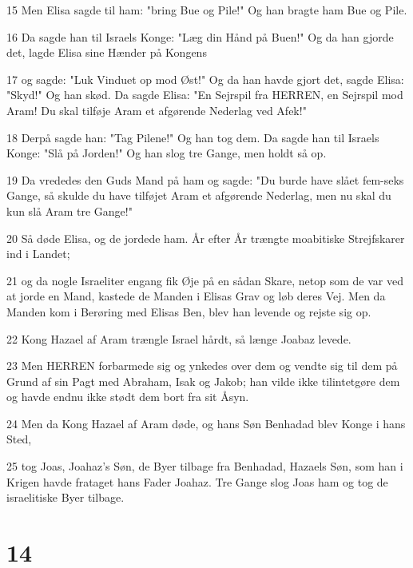 \par 15 Men Elisa sagde til ham: "bring Bue og Pile!" Og han bragte ham Bue og Pile.
\par 16 Da sagde han til Israels Konge: "Læg din Hånd på Buen!" Og da han gjorde det, lagde Elisa sine Hænder på Kongens
\par 17 og sagde: "Luk Vinduet op mod Øst!" Og da han havde gjort det, sagde Elisa: "Skyd!" Og han skød. Da sagde Elisa: "En Sejrspil fra HERREN, en Sejrspil mod Aram! Du skal tilføje Aram et afgørende Nederlag ved Afek!"
\par 18 Derpå sagde han: "Tag Pilene!" Og han tog dem. Da sagde han til Israels Konge: "Slå på Jorden!" Og han slog tre Gange, men holdt så op.
\par 19 Da vrededes den Guds Mand på ham og sagde: "Du burde have slået fem-seks Gange, så skulde du have tilføjet Aram et afgørende Nederlag, men nu skal du kun slå Aram tre Gange!"
\par 20 Så døde Elisa, og de jordede ham. År efter År trængte moabitiske Strejfskarer ind i Landet;
\par 21 og da nogle Israeliter engang fik Øje på en sådan Skare, netop som de var ved at jorde en Mand, kastede de Manden i Elisas Grav og løb deres Vej. Men da Manden kom i Berøring med Elisas Ben, blev han levende og rejste sig op.
\par 22 Kong Hazael af Aram trængle Israel hårdt, så længe Joabaz levede.
\par 23 Men HERREN forbarmede sig og ynkedes over dem og vendte sig til dem på Grund af sin Pagt med Abraham, Isak og Jakob; han vilde ikke tilintetgøre dem og havde endnu ikke stødt dem bort fra sit Åsyn.
\par 24 Men da Kong Hazael af Aram døde, og hans Søn Benhadad blev Konge i hans Sted,
\par 25 tog Joas, Joahaz's Søn, de Byer tilbage fra Benhadad, Hazaels Søn, som han i Krigen havde frataget hans Fader Joahaz. Tre Gange slog Joas ham og tog de israelitiske Byer tilbage.

\chapter{14}


